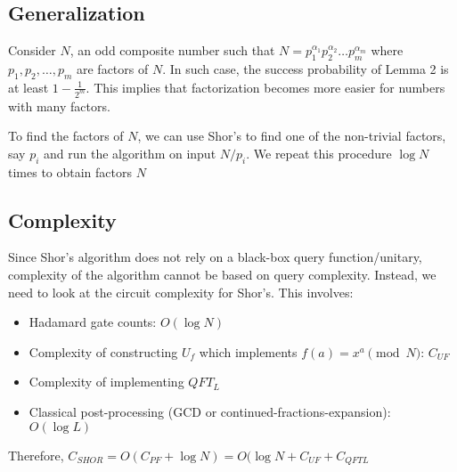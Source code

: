 \documentclass[11.5pt, paper=a4]{article}
\theoremstyle{definition}
\numberwithin{theorem}{section}
\begin{document}
\subsection{Generalization}
Consider $N$, an odd composite number such that  $N= p_1^{\alpha_1} p_2^{\alpha_2}\dots p_m^{\alpha_m}$ where $p_1, p_2, \dots, p_m$ are factors of $N$. In such case, the success probability of Lemma 2 is at least $1 - \frac{1}{2^m}$. This implies that factorization becomes more easier for numbers with many factors.

To find the factors of $N$, we can use Shor's to find one of the non-trivial factors, say $p_i$ and run the algorithm on input $N/p_i$. We repeat this procedure $\log N$ times to obtain factors $N$

\subsection{Complexity}
Since Shor's algorithm does not rely on a black-box query function/unitary, complexity of the algorithm cannot be based on query complexity. Instead, we need to look at the circuit complexity for Shor's. This involves:
\begin{itemize}
    \item Hadamard gate counts: $O(\log N)$
    \item Complexity of constructing $U_f$ which implements $f(a) = x^a\pmod{N}$: $C_{UF}$
    \item Complexity of implementing $QFT_L$
    \item Classical post-processing (GCD or continued-fractions-expansion): $O(\log L)$
\end{itemize}

Therefore, $C_{SHOR} = O(C_{PF} + \log N) = O(\log N + C_{UF} + C_{QFTL}$


\end{document}
